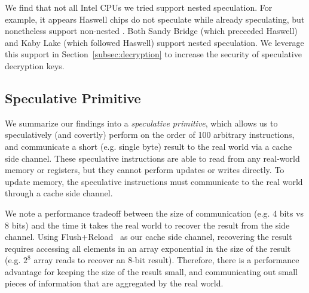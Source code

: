 We find that not all Intel CPUs we tried support nested speculation. For
example, it appears Haswell chips do not speculate while already speculating,
but nonetheless support non-nested \speculake. Both Sandy Bridge (which
preceeded Haswell) and Kaby Lake (which followed Haswell) support nested
speculation.
We leverage this support in Section~\ref{subsec:decryption} to
increase the security of speculative decryption keys.


\subsection{Speculative Primitive}

We summarize our findings into a \emph{speculative primitive}, which allows us to
speculatively (and covertly) perform on the order of 100 arbitrary
instructions, and communicate a short (e.g. single byte) result to the real
world via a cache side channel. These speculative instructions are able to read
from any real-world memory or registers, but they cannot perform updates or
writes directly. To update memory, the speculative instructions must communicate
to the real world through a cache side channel.

We note a performance tradeoff between the size of communication (e.g. 4 bits vs 8
bits) and the time it takes the real world to recover the result from the side
channel. Using Flush+Reload~\cite{flush-reload} as our cache side channel,
recovering the result requires accessing all elements in an array exponential in
the size of the result (e.g. $2^8$ array reads to recover an 8-bit result). 
Therefore, there is a
performance advantage for keeping the size of the result small, and communicating
out small pieces of information that are aggregated by the real world.


